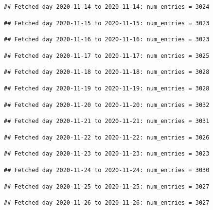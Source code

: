 \documentclass[]{article}
\begin{document}
\begin{verbatim}
## Fetched day 2020-11-14 to 2020-11-14: num_entries = 3024
\end{verbatim}

\begin{verbatim}
## Fetched day 2020-11-15 to 2020-11-15: num_entries = 3023
\end{verbatim}

\begin{verbatim}
## Fetched day 2020-11-16 to 2020-11-16: num_entries = 3023
\end{verbatim}

\begin{verbatim}
## Fetched day 2020-11-17 to 2020-11-17: num_entries = 3025
\end{verbatim}

\begin{verbatim}
## Fetched day 2020-11-18 to 2020-11-18: num_entries = 3028
\end{verbatim}

\begin{verbatim}
## Fetched day 2020-11-19 to 2020-11-19: num_entries = 3028
\end{verbatim}

\begin{verbatim}
## Fetched day 2020-11-20 to 2020-11-20: num_entries = 3032
\end{verbatim}

\begin{verbatim}
## Fetched day 2020-11-21 to 2020-11-21: num_entries = 3031
\end{verbatim}

\begin{verbatim}
## Fetched day 2020-11-22 to 2020-11-22: num_entries = 3026
\end{verbatim}

\begin{verbatim}
## Fetched day 2020-11-23 to 2020-11-23: num_entries = 3023
\end{verbatim}

\begin{verbatim}
## Fetched day 2020-11-24 to 2020-11-24: num_entries = 3030
\end{verbatim}

\begin{verbatim}
## Fetched day 2020-11-25 to 2020-11-25: num_entries = 3027
\end{verbatim}

\begin{verbatim}
## Fetched day 2020-11-26 to 2020-11-26: num_entries = 3027
\end{verbatim}
\end{document}
